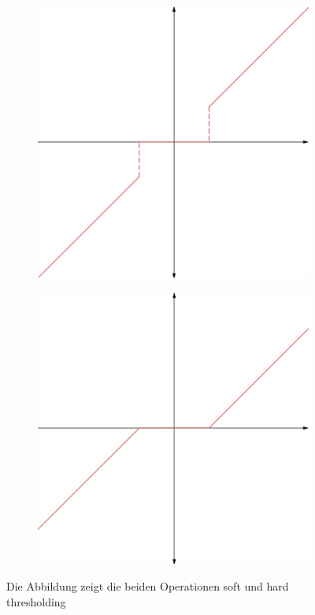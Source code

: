 \begin{figure}
\centering
	\begin{subfigure}{0.4\textwidth}
	\centering
	\includegraphics[width = \textwidth]{figures/hard_thresholding.png}
	\label{hard_thresholding}
	\end{subfigure}\hspace{1cm}
	\begin{subfigure}{0.4\textwidth}
	\centering
	\includegraphics[width = \textwidth]{figures/soft_thresholding.png}
	\label{soft_thresholding}
	\end{subfigure}
\caption{Die Abbildung zeigt die beiden Operationen soft und hard thresholding}
\label{thresholding_figure}
\end{figure}


